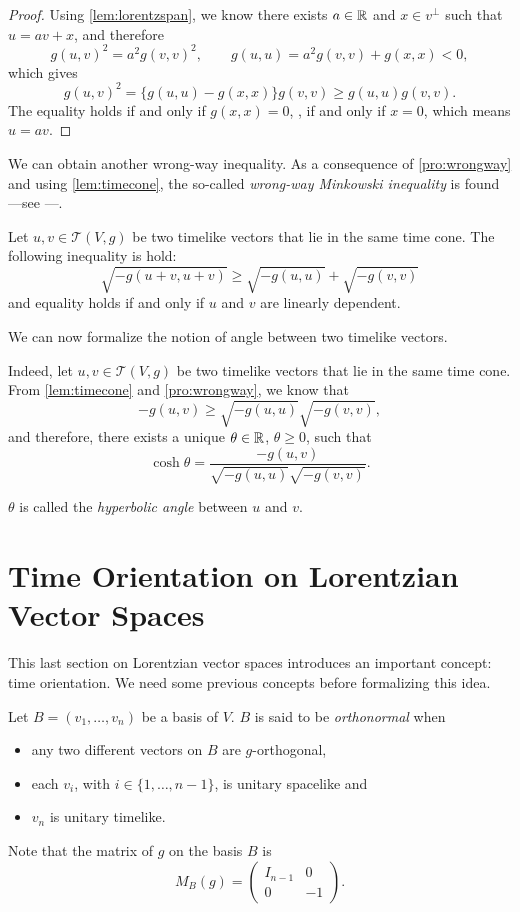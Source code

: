 \begin{proof}
    Using \autoref{lem:lorentzspan}, we know there exists $a \in \mathbb{R}$ and $x \in v^\perp$ such that $u=av+x$, and therefore
    \[
        g(u,v)^2=a^2g(v,v)^2, \quad \quad g(u,u)=a^2g(v,v)+g(x,x)<0,
    \]
    which gives
    \[
        g(u,v)^2=\{g(u,u)-g(x,x)\}g(v,v) \geq g(u,u)g(v,v).
    \]
    The equality holds if and only if $g(x,x)=0$, \ie, if and only if $x=0$, which means $u=av$.
\end{proof}


We can obtain another wrong-way inequality. As a consequence of \autoref{pro:wrongway} and using \autoref{lem:timecone}, the so-called \emph{wrong-way Minkowski inequality} is found ---see \cite[Cor. 5.31]{oneill83}---.

\begin{corollary}
	\label{Minkowski}
    Let $u,v \in \mathcal{T}(V,g)$ be two timelike vectors that lie in the same time cone. The following inequality is hold:
    \[
        \sqrt{-g(u+v,u+v)} \geq \sqrt{-g(u,u)}+\sqrt{-g(v,v)}
    \]
    and equality holds if and only if $u$ and $v$ are linearly dependent.
\end{corollary}

We can now formalize the notion of angle between two timelike vectors.

Indeed, let $u, v \in \mathcal{T}(V,g)$ be two timelike vectors that lie in the same time cone. From \autoref{lem:timecone} and \autoref{pro:wrongway}, we know that
\[
-g(u,v) \geq \sqrt{-g(u,u)}\sqrt{-g(v,v)},
\]
and therefore, there exists a unique $\theta \in \mathbb{R}$, $\theta \geq 0$, such that
\[
\cosh \theta =\frac{-g(u,v)}{\sqrt{-g(u,u)}\sqrt{-g(v,v)}}.
\]

$\theta$ is called the \emph{hyperbolic angle} between $u$ and $v$.

\section{Time Orientation on Lorentzian Vector Spaces}

This last section on Lorentzian vector spaces introduces an important concept: time orientation. We need some previous concepts before formalizing this idea.

\begin{definition}
	Let $B = (v_1, \dots, v_n)$ be a basis of $V$. $B$ is said to be \emph{orthonormal} when
	\begin{itemize}
		\item any two different vectors on $B$ are $g$-orthogonal,
		\item each $v_i$, with $i \in \{1,\dots,n-1\}$, is unitary spacelike and
		\item $v_n$ is unitary timelike.
	\end{itemize}

	Note that the matrix of $g$ on the basis $B$ is
	\[
		M_B(g) = \begin{pmatrix}
			I_{n-1} & 0  \\
			0 & -1
		\end{pmatrix}.
	\]
\end{definition}

